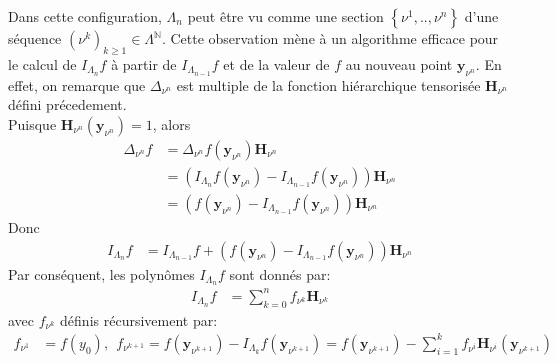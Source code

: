 
\vspace{0.5cm}
Dans cette configuration, $\Lambda_n$ peut être vu comme une section $\left \{ \nu^1, .. , \nu^n \right \}$ d'une séquence
$(\nu^k)_{k \geq 1} \in \Lambda^{\mathbb{N}}$. Cette observation mène à un algorithme efficace pour le calcul de
$I_{\Lambda_n}f$ à partir de $I_{\Lambda_{n-1}}f$ et de la valeur de $f$ au nouveau point $\textbf{y}_{\nu^n}$. En effet,
on remarque que $\Delta_{\nu^n}$ est multiple de la fonction hiérarchique tensorisée $\textbf{H}_{\nu^n}$ défini précedement.\\
Puisque $\textbf{H}_{\nu^n}(\textbf{y}_{\nu^n}) = 1$, alors \\
\begin{align}
	 \Delta_{\nu^n}f &= \Delta_{\nu^n} f(\textbf{y}_{\nu^n}) \textbf{H}_{\nu^n} \\
	 &= (I_{\Lambda_n}f(\textbf{y}_{\nu^n}) - I_{\Lambda_{n-1}}f(\textbf{y}_{\nu^n})) \textbf{H}_{\nu^n}  \nonumber \\
	 &= (f(\textbf{y}_{\nu^n}) - I_{\Lambda_{n-1}}f(\textbf{y}_{\nu^n})) \textbf{H}_{\nu^n} \nonumber
\end{align}
Donc
\begin{align}
	 I_{\Lambda_n}f & = I_{\Lambda_{n-1}}f + (f(\textbf{y}_{\nu^n}) - I_{\Lambda_{n-1}}f(\textbf{y}_{\nu^n})) \textbf{H}_{\nu^n}
\end{align}
Par conséquent, les polynômes $I_{\Lambda_n}f$ sont donnés par:
\begin{align}
	 I_{\Lambda_n}f & = \sum_{k=0}^n f_{\nu^k} \textbf{H}_{\nu^k}
\end{align}
avec $f_{\nu^k}$ définis récursivement par:
\begin{align}
	 f_{\nu^1} & = f(y_0),\ \ f_{\nu^{k+1}} = f(\textbf{y}_{\nu^{k+1}}) - I_{\Lambda_{k}}f(\textbf{y}_{\nu^{k+1}}) = f(\textbf{y}_{\nu^{k+1}}) - \sum_{i=1}^k f_{\nu^i} \textbf{H}_{\nu^i}(\textbf{y}_{\nu^{k+1}})
\end{align}


